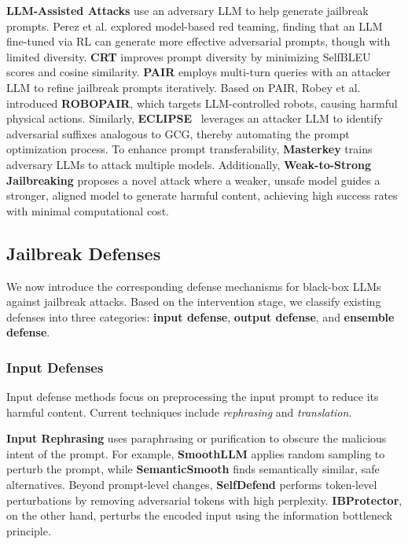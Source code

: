 \textbf{LLM-Assisted Attacks} use an adversary LLM to help generate jailbreak prompts. Perez et al. \cite{perez2022red} explored model-based red teaming, finding that an LLM fine-tuned via RL can generate more effective adversarial prompts, though with limited diversity. \textbf{CRT} \cite{hong2024curiosity} improves prompt diversity by minimizing SelfBLEU scores and cosine similarity. \textbf{PAIR} \cite{chao2023jailbreaking} employs multi-turn queries with an attacker LLM to refine jailbreak prompts iteratively. Based on PAIR, Robey et al. \cite{robey2024jailbreaking} introduced \textbf{ROBOPAIR}, which targets LLM-controlled robots, causing harmful physical actions. 
Similarly, \textbf{ECLIPSE}~\cite{jiang2024unlocking} leverages an attacker LLM to identify adversarial suffixes analogous to GCG, thereby automating the prompt optimization process.
To enhance prompt transferability, \textbf{Masterkey} \cite{deng2024masterkey} trains adversary LLMs to attack multiple models.
Additionally, \textbf{Weak-to-Strong Jailbreaking} \cite{zhao2024weak} proposes a novel attack where a weaker, unsafe model guides a stronger, aligned model to generate harmful content, achieving high success rates with minimal computational cost.


\subsection{Jailbreak Defenses}
\label{sec:llm_jailbreak_defenses}

We now introduce the corresponding defense mechanisms for black-box LLMs against jailbreak attacks. Based on the intervention stage, we classify existing defenses into three categories: \textbf{input defense}, \textbf{output defense}, and \textbf{ensemble defense}.

\subsubsection{Input Defenses}

Input defense methods focus on preprocessing the input prompt to reduce its harmful content. Current techniques include \emph{rephrasing} and \emph{translation}.

\textbf{Input Rephrasing} uses paraphrasing or purification to obscure the malicious intent of the prompt. For example, \textbf{SmoothLLM} \cite{robey2023smoothllm} applies random sampling to perturb the prompt, while \textbf{SemanticSmooth} \cite{ji2024defending} finds semantically similar, safe alternatives. Beyond prompt-level changes, \textbf{SelfDefend} \cite{wang2024selfdefend} performs token-level perturbations by removing adversarial tokens with high perplexity. \textbf{IBProtector}, on the other hand, \cite{liu2024protecting} perturbs the encoded input using the information bottleneck principle.



